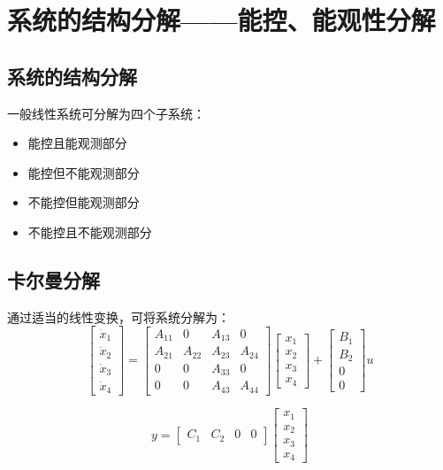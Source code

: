 \section{系统的结构分解——能控、能观性分解}

\subsection{系统的结构分解}
一般线性系统可分解为四个子系统：
\begin{itemize}
    \item 能控且能观测部分
    \item 能控但不能观测部分
    \item 不能控但能观测部分
    \item 不能控且不能观测部分
\end{itemize}

\subsection{卡尔曼分解}
通过适当的线性变换，可将系统分解为：
\[\begin{bmatrix} \dot{x}_1 \\ \dot{x}_2 \\ \dot{x}_3 \\ \dot{x}_4 \end{bmatrix} = 
\begin{bmatrix}
A_{11} & 0 & A_{13} & 0 \\
A_{21} & A_{22} & A_{23} & A_{24} \\
0 & 0 & A_{33} & 0 \\
0 & 0 & A_{43} & A_{44}
\end{bmatrix}
\begin{bmatrix} x_1 \\ x_2 \\ x_3 \\ x_4 \end{bmatrix} +
\begin{bmatrix} B_1 \\ B_2 \\ 0 \\ 0 \end{bmatrix} u\]

\[y = \begin{bmatrix} C_1 & C_2 & 0 & 0 \end{bmatrix} \begin{bmatrix} x_1 \\ x_2 \\ x_3 \\ x_4 \end{bmatrix}\]
